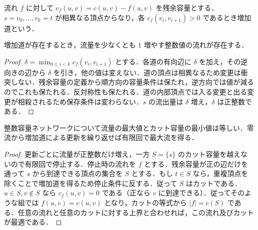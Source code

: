 \begin{defn}[残余容量と増加道]
流れ $f$ に対して $c_f(u,v)=c(u,v)-f(u,v)$ を残余容量とする．$s=v_0,\ldots,v_k=t$ が相異なる頂点からなり，各 $c_f(v_i,v_{i+1})>0$ であるとき増加道という．
\end{defn}
\begin{prop}[増加道による流れの更新]
増加道が存在するとき，流量を少なくとも $1$ 増やす整数値の流れが存在する．
\end{prop}
\begin{proof}
$\delta=\min_{0\leq i<k}c_f(v_i,v_{i+1})$ とする．各道の有向辺に $\delta$ を加え，その逆向きの辺から $\delta$ を引き，他の値は変えない．道の頂点は相異なるため変更は衝突しない．残余容量の定義から順方向の容量条件は保たれ，逆方向では値が減るのでこれも保たれる．反対称性も保たれる．道の内部頂点では入る変更と出る変更が相殺されるため保存条件は変わらない．$s$ の流出量は $\delta$ 増え，$\delta$ は正整数である．
\end{proof}
\begin{prop}[最大流最小カットの定理]
整数容量ネットワークについて流量の最大値とカット容量の最小値は等しい．零流から増加道による更新を繰り返せば有限回で最大流を得る．
\end{prop}
\begin{proof}
更新ごとに流量が正整数だけ増え，一方 $S=\{s\}$ のカット容量を越えないので有限回で停止する．停止時の流れを $f$ とする．残余容量が正の辺だけを通って $s$ から到達できる頂点の集合を $S$ とする．もし $t\in S$ なら，重複頂点を除くことで増加道を得るため停止条件に反する．従って $S$ はカットである．$u\in S,v\notin S$ なら $c_f(u,v)=0$ である（正なら $v$ に到達できる）．従ってそのような組では $f(u,v)=c(u,v)$ となり，カットの等式から $|f|=c(S)$ である．任意の流れと任意のカットに対する上界と合わせれば，この流れ及びカットが最適である．
\end{proof}
